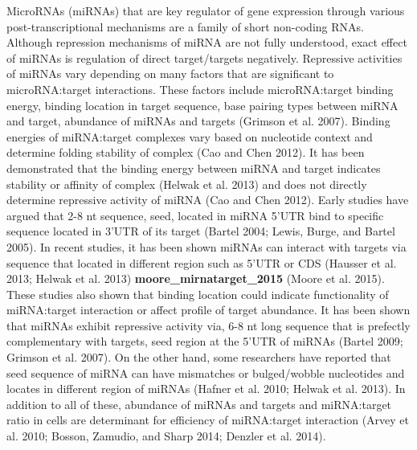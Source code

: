 \documentclass[]{article}
\begin{document}
MicroRNAs (miRNAs) that are key regulator of gene expression through
various post-transcriptional mechanisms are a family of short non-coding
RNAs. Although repression mechanisms of miRNA are not fully understood,
exact effect of miRNAs is regulation of direct target/targets
negatively. Repressive activities of miRNAs vary depending on many
factors that are significant to microRNA:target interactions. These
factors include microRNA:target binding energy, binding location in
target sequence, base pairing types between miRNA and target, abundance
of miRNAs and targets (Grimson et al. 2007). Binding energies of
miRNA:target complexes vary based on nucleotide context and determine
folding stability of complex (Cao and Chen 2012). It has been
demonstrated that the binding energy between miRNA and target indicates
stability or affinity of complex (Helwak et al. 2013) and does not
directly determine repressive activity of miRNA (Cao and Chen 2012).
Early studies have argued that 2-8 nt sequence, seed, located in miRNA
5'UTR bind to specific sequence located in 3'UTR of its target (Bartel
2004; Lewis, Burge, and Bartel 2005). In recent studies, it has been
shown miRNAs can interact with targets via sequence that located in
different region such as 5'UTR or CDS (Hausser et al. 2013; Helwak et
al. 2013) \textbf{moore\_mirnatarget\_2015} (Moore et al. 2015). These
studies also shown that binding location could indicate functionality of
miRNA:target interaction or affect profile of target abundance. It has
been shown that miRNAs exhibit repressive activity via, 6-8 nt long
sequence that is prefectly complementary with targets, seed region at
the 5'UTR of miRNAs (Bartel 2009; Grimson et al. 2007). On the other
hand, some researchers have reported that seed sequence of miRNA can
have mismatches or bulged/wobble nucleotides and locates in different
region of miRNAs (Hafner et al. 2010; Helwak et al. 2013). In addition
to all of these, abundance of miRNAs and targets and miRNA:target ratio
in cells are determinant for efficiency of miRNA:target interaction
(Arvey et al. 2010; Bosson, Zamudio, and Sharp 2014; Denzler et al.
2014).
\end{document}
